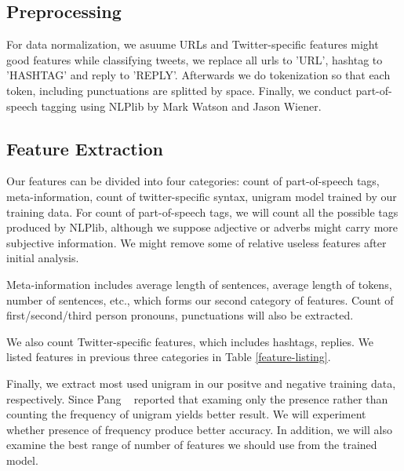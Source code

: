 \documentclass[12pt]{article}
\begin{document}
\subsection{Preprocessing}\label{preprocessing}
For data normalization, we asuume URLs and Twitter-specific features might good features while classifying tweets, we replace all urls to 'URL', hashtag to 'HASHTAG' and reply to 'REPLY'. Afterwards we do tokenization so that each token, including punctuations are splitted by space. Finally, we conduct part-of-speech tagging using NLPlib \cite{NLPlib} by Mark Watson and Jason Wiener.

\subsection{Feature Extraction}\label{feature-extraction}
Our features can be divided into four categories: count of part-of-speech tags, meta-information, count of twitter-specific syntax, unigram model trained by our training data. For count of part-of-speech tags, we will count all the possible tags produced by NLPlib, although we suppose adjective or adverbs might carry more subjective information. We might remove some of relative useless features after initial analysis.

Meta-information includes average length of sentences, average length of tokens, number of sentences, etc., which forms our second category of features. Count of first/second/third person pronouns, punctuations will also be extracted.

We also count Twitter-specific features, which includes hashtags, replies. We listed features in previous three categories in Table \ref{feature-listing}.

Finally, we extract most used unigram in our positve and negative training data, respectively. Since Pang \etal~\cite{Pang:02} reported that examing only the presence rather than counting the frequency of unigram yields better result. We will experiment whether presence of frequency produce better accuracy. In addition, we will also examine the best range of number of features we should use from the trained model.
\end{document}
